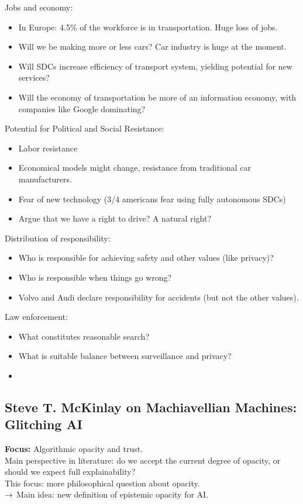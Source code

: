 Jobs and economy:
\begin{itemize}
    \item In Europe: 4.5\% of the workforce is in transportation. Huge loss of jobs.
    \item Will we be making more or less cars? Car industry is huge at the moment.
    \item Will SDCs increase efficiency of transport system, yielding potential for new services?
    \item Will the economy of transportation be more of an information economy, with companies like Google dominating?
\end{itemize}

Potential for Political and Social Resistance:
\begin{itemize}
    \item Labor resistance
    \item Economical models might change, resistance from traditional car manufacturers.
    \item Fear of new technology (3/4 americans fear using fully autonomous SDCs)
    \item Argue that we have a right to drive? A natural right?
\end{itemize}

Distribution of responsibility:
\begin{itemize}
    \item Who is responsible for achieving safety and other values (like privacy)?
    \item Who is responsible when things go wrong?
    \item Volvo and Audi declare responsibility for accidents (but not the other values).
\end{itemize}

Law enforcement:
\begin{itemize}
    \item What constitutes reasonable search?
    \item What is suitable balance between surveillance and privacy?
    \item 
\end{itemize}


\subsection{Steve T. McKinlay on Machiavellian Machines: Glitching AI}

{\bf Focus:} Algorithmic opacity and trust. \\

Main perspective in literature: do we accept the current degree of opacity, or should we expect full explainability? \\

This focus: more philosophical question about opacity. \\

$\rightarrow$ Main idea: new definition of epistemic opacity for AI. \\


